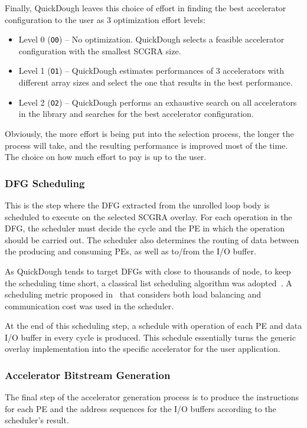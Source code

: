 Finally, QuickDough leaves this choice of effort in finding the best accelerator configuration to the user as 3 optimization effort levels:
\begin{itemize}[nosep]
\item Level 0 (\texttt{O0}) -- No optimization.  QuickDough selects a feasible accelerator configuration with the smallest SCGRA size.
\item Level 1 (\texttt{O1}) -- QuickDough estimates performances of 3 accelerators with different array sizes and select the one that results in the best performance.
\item Level 2 (\texttt{O2}) -- QuickDough performs an exhaustive search on all accelerators in the library and searches for the best accelerator configuration. 
\end{itemize}

Obviously, the more effort is being put into the selection process, the longer the process will take, and the resulting performance is improved most of the time.
The choice on how much effort to pay is up to the user.

\subsubsection{DFG Scheduling}
This is the step where the DFG extracted from the unrolled loop body is scheduled to execute on the selected SCGRA overlay.
For each operation in the DFG, the scheduler must decide the cycle and the PE in which the operation should be carried out.
The scheduler also determines the routing of data between the producing and consuming PEs, as well as to/from the I/O buffer.

As QuickDough tends to target DFGs with close to thousands of node, to keep the scheduling time short, a classical list scheduling algorithm was adopted~\cite{schutten1996list}.
A scheduling metric proposed in~\cite{Lin:2012:EDC:2460216.2460227} that considers both load balancing and communication cost was used in the scheduler.

At the end of this scheduling step, a schedule with operation of each PE and data I/O buffer in every cycle is produced.
This schedule essentially turns the generic overlay implementation into the specific accelerator for the user application.


\subsubsection{Accelerator Bitstream Generation}
The final step of the accelerator generation process is to produce the instructions for each PE and the address sequences for the I/O buffers according to the scheduler's result.

